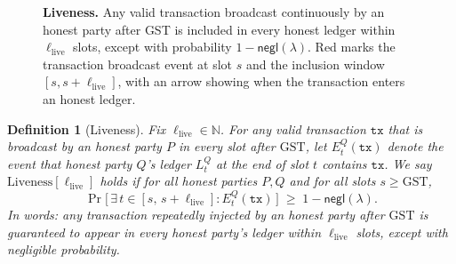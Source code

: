 \documentclass[11pt]{article}
\newtheorem{definition}[theorem]{Definition}
\newcommand{\negl}{\ensuremath{\mathsf{negl}}\xspace}
\newcommand{\tx}{\ensuremath{\mathtt{tx}}\xspace}
\begin{document}
\begin{figure}[htp!]
\centering
{}
\caption{\textbf{Liveness.} 
\small
Any valid transaction broadcast continuously by an honest party after GST is included in every honest ledger within $\ell_{\mathrm{live}}$ slots, except with probability $1-\negl(\lambda)$. 
Red marks the transaction broadcast event at slot $s$ and the inclusion window $[s,s+\ell_{\mathrm{live}}]$, with an arrow showing when the transaction enters an honest ledger.}

\label{fig:liveness}
\end{figure}


\begin{definition}[Liveness]
Fix $\ell_{\mathrm{live}} \in \mathbb{N}$. For any valid transaction $\tx$ that is
broadcast by an honest party $P$ in every slot after $\mathrm{GST}$, let
$E_t^Q(\tx)$ denote the event that honest party $Q$'s ledger $L_t^Q$ at the end of slot $t$
contains $\tx$. We say $\mathrm{Liveness}[\ell_{\mathrm{live}}]$ holds if for all honest parties $P,Q$
and for all slots $s \ge \mathrm{GST}$,
\[
\Pr\!\Big[\, \exists\, t \in [s,\,s+\ell_{\mathrm{live}}] : E_t^Q(\tx) \,\Big] \;\ge\; 1-\negl(\lambda).
\]
In words: any transaction repeatedly injected by an honest party after $\mathrm{GST}$
is guaranteed to appear in every honest party’s ledger within $\ell_{\mathrm{live}}$ slots,
except with negligible probability.
\end{definition}
\end{document}
